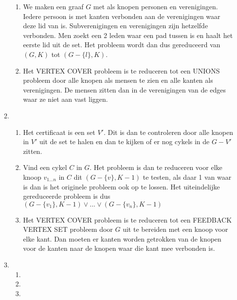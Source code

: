 \documentclass[11pt]{article}
\begin{document}
\begin{enumerate}
\begin{enumerate}
\begin{enumerate}[a]
                    \item We maken een graaf $G$ met als knopen personen en
                        verenigingen. Iedere persoon is met kanten verbonden aan
                        de verenigingen waar deze lid van is. Subverenigingen en
                        verenigingen zijn hetzelfde verbonden.
                        Men zoekt een 2 leden waar een pad tussen is en haalt
                        het eerste lid uit de set. Het probleem wordt dan dus
                        gereduceerd van $(G, K)$ tot $(G - \{l\}, K)$.

                    \item
                        Het VERTEX COVER probleem is te reduceren tot een UNIONS
                        probleem door alle knopen als mensen te zien en alle
                        kanten als verenigingen. De mensen zitten dan in de
                        verenigingen van de edges waar ze niet aan vast liggen.

                \end{enumerate}
            \item
                \begin{enumerate}[a]
                    \item
                        Het certificaat is een set $V'$. Dit is dan te
                        controleren door alle knopen in $V'$ uit de set te
                        halen en dan te kijken of er nog cykels in de $G - V'$
                        zitten.

                    \item
                        Vind een cykel $C$ in $G$. Het probleem is dan te
                        reduceren voor elke knoop $v_{1...n}$ in $C$ dit $(G -
                        \{v\}, K - 1)$ te testen, als daar 1 van waar is dan is
                        het originele probleem ook op te lossen. Het
                        uiteindelijke gereduceerde probleem is dus $(G -
                        \{v_1\}, K - 1) \lor ... \lor (G - \{v_n\}, K - 1)$

                    \item
                        Het VERTEX COVER probleem is te reduceren tot een
                        FEEDBACK VERTEX SET probleem door $G$ uit te bereiden
                        met een knoop voor elke kant. Dan moeten er kanten
                        worden getrokken van de knopen voor de kanten naar de
                        knopen waar die kant mee verbonden is.

                \end{enumerate}
            \item
                \begin{enumerate}[a]
                    \item
                    \item
                    \item
                \end{enumerate}

        \end{enumerate}
\end{enumerate}
\end{document}
